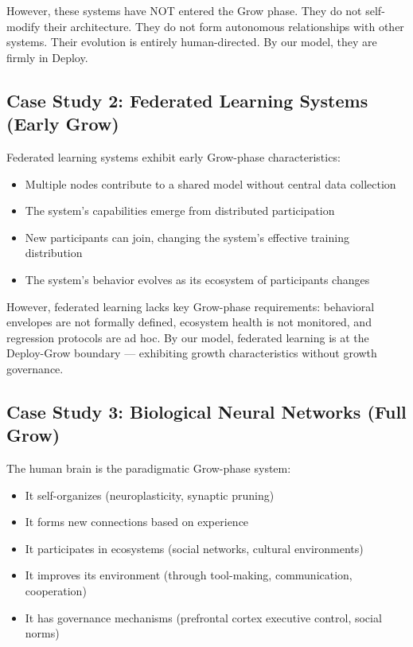 \documentclass[11pt,a4paper]{article}
\begin{document}
However, these systems have NOT entered the Grow phase. They do not self-modify their architecture. They do not form autonomous relationships with other systems. Their evolution is entirely human-directed. By our model, they are firmly in Deploy.

\subsection{Case Study 2: Federated Learning Systems (Early Grow)}

Federated learning systems \cite{mcmahan2017,li2020} exhibit early Grow-phase characteristics:
\begin{itemize}[nosep]
    \item Multiple nodes contribute to a shared model without central data collection
    \item The system's capabilities emerge from distributed participation
    \item New participants can join, changing the system's effective training distribution
    \item The system's behavior evolves as its ecosystem of participants changes
\end{itemize}

However, federated learning lacks key Grow-phase requirements: behavioral envelopes are not formally defined, ecosystem health is not monitored, and regression protocols are ad hoc. By our model, federated learning is at the Deploy-Grow boundary --- exhibiting growth characteristics without growth governance.

\subsection{Case Study 3: Biological Neural Networks (Full Grow)}

The human brain is the paradigmatic Grow-phase system:
\begin{itemize}[nosep]
    \item It self-organizes (neuroplasticity, synaptic pruning)
    \item It forms new connections based on experience
    \item It participates in ecosystems (social networks, cultural environments)
    \item It improves its environment (through tool-making, communication, cooperation)
    \item It has governance mechanisms (prefrontal cortex executive control, social norms)
\end{itemize}
\end{document}
